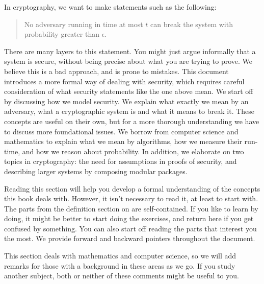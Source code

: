 In cryptography, we want to make statements such as the following:
\begin{quote}
    No adversary running in time at most $t$ can break the system with probability greater than $\epsilon$.
\end{quote}

There are many layers to this statement. You might just argue informally that a system is secure, without being precise about what you are trying to prove. We believe this is a bad approach, and is prone to mistakes. This document introduces a more formal way of dealing with security, which requires careful consideration of what security statements like the one above mean. We start off by discussing how we model security. We explain what exactly we mean by an adversary, what a cryptographic system is and what it means to break it. These concepts are useful on their own, but for a more thorough understanding we have to discuss more foundational issues. We borrow from computer science and mathematics to explain what we mean by algorithms, how we measure their run-time, and how we reason about probability. In addition, we elaborate on two topics in cryptography: the need for assumptions in proofs of security, and describing larger systems by composing modular packages.

Reading this section will help you develop a formal understanding of the concepts this book deals with. However, it isn't necessary to read it, at least to start with. The parts from the definition section on are self-contained. If you like to learn by doing, it might be better to start doing the exercises, and return here if you get confused by something. You can also start off reading the parts that interest you the most. We provide forward and backward pointers throughout the document.

This section deals with mathematics and computer science, so we will add remarks for those with a background in these areas as we go. If you study another subject, both or neither of these comments might be useful to you.